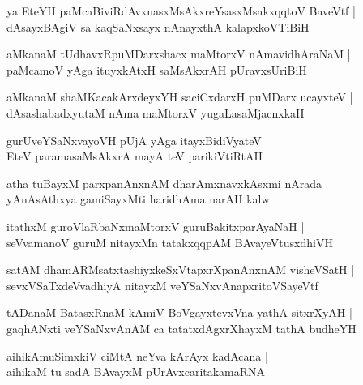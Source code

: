 \documentclass[twoside,12pt,openright]{book}
\newcounter{shloka}[chapter]
\begin{document}
\begin{shloka}%
ya EteYH paMcaBiviRdAvxnasxMsAkxreYsasxMsakxqqtoV BaveVtf |\\
dAsayxBAgiV sa kaqSaNxsayx nAnayxthA kalapxkoVTiBiH 
\end{shloka}

\begin{shloka}%
aMkanaM tUdhavxRpuMDarxshacx maMtorxV nAmavidhAraNaM |\\
paMcamoV yAga ituyxkAtxH saMsAkxrAH pUravxsUriBiH 
\end{shloka}

\begin{shloka}%
aMkanaM shaMKacakArxdeyxYH saciCxdarxH puMDarx ucayxteV |\\
dAsashabadxyutaM nAma maMtorxV yugaLasaMjacnxkaH 
\end{shloka}

\begin{shloka}%
gurUveYSaNxvayoVH pUjA yAga itayxBidiVyateV |\\
EteV paramasaMsAkxrA mayA teV parikiVtiRtAH 
\end{shloka}

\begin{shloka}%
atha tuBayxM parxpanAnxnAM dharAmxnavxkAsxmi nArada |\\
yAnAsAthxya gamiSayxMti haridhAma narAH kalw 
\end{shloka}

\begin{shloka}%
itathxM guroVlaRbaNxmaMtorxV guruBakitxparAyaNaH |\\
seVvamanoV guruM nitayxMn tatakxqqpAM BAvayeVtusxdhiVH 
\end{shloka}

\begin{shloka}%
satAM dhamARMsatxtashiyxkeSxVtapxrXpanAnxnAM visheVSatH |\\
sevxVSaTxdeVvadhiyA nitayxM veYSaNxvAnapxritoVSayeVtf 
\end{shloka}

\begin{shloka}%
tADanaM BatasxRnaM kAmiV BoVgayxtevxVna yathA sitxrXyAH |\\
gaqhANxti veYSaNxvAnAM ca tatatxdAgxrXhayxM tathA budheYH 
\end{shloka}

\begin{shloka}%
aihikAmuSimxkiV ciMtA neYva kArAyx kadAcana |\\
aihikaM tu sadA BAvayxM pUrAvxcaritakamaRNA 
\end{shloka}
\end{document}

